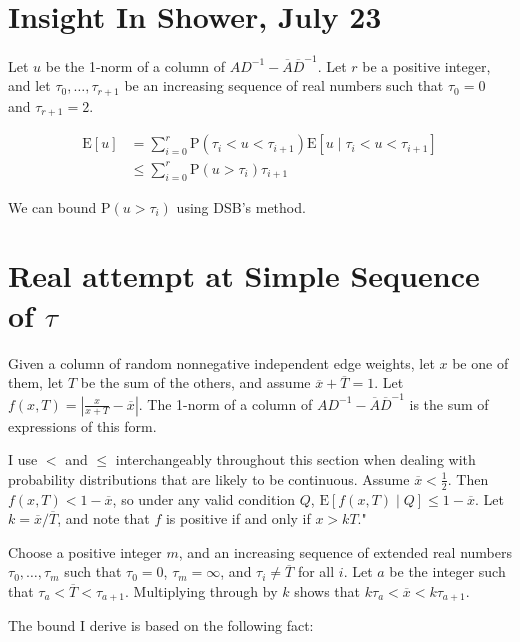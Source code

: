 \documentclass{article}
\newcommand \E[1] {\mathrm E \left[#1\right]} %
\newcommand \p[1] {\mathrm P \left(#1\right)}
\newcommand \inv [1] {{#1}^{-1}} %
\begin{document}

\section{Insight In Shower, July 23}

Let $u$ be the 1-norm of a column of $A\inv D - \overline A\inv{\overline D}$. Let $r$ be a positive integer, and let $\tau_0,\ldots,\tau_{r+1}$ be an increasing sequence of real numbers such that $\tau_0=0$ and $\tau_{r+1} = 2$.

\begin{align*}
\E u &= \sum_{i=0}^r \p{\tau_i<u<\tau_{i+1}}\E{u\mid \tau_i<u<\tau_{i+1}} \\
&\leq \sum_{i=0}^r \p{u>\tau_i}\tau_{i+1}
\end{align*}

We can bound $\p{u>\tau_i}$ using DSB's method.

\section{Real attempt at Simple Sequence of $\tau$}


Given a column of random nonnegative independent edge weights, let $x$ be one of them, let $T$ be the sum of the others, and assume $\overline x + \overline T = 1$. Let $f(x,T)=\left|\frac{x}{x+T}-\overline x\right|$. The 1-norm of a column of $A\inv D - \overline A\inv{\overline D}$ is the sum of expressions of this form.

I use $<$ and $\leq$ interchangeably throughout this section when dealing with probability distributions that are likely to be continuous. Assume $\overline x < \frac 1 2$. Then $f(x,T)<1-\overline x$, so under any valid condition $Q$, $\E{f(x,T)\mid Q} \leq 1-\overline x$. Let $k=\overline x / \overline T$, and note that $f$ is positive if and only if $x>kT$."

Choose a positive integer $m$, and an increasing sequence of extended real numbers $\tau_0,\ldots,\tau_m$ such that $\tau_0=0$, $\tau_m=\infty$, and $\tau_i\neq\overline T$ for all $i$. Let $a$ be the integer such that $\tau_a<\overline T<\tau_{a+1}$. Multiplying through by $k$ shows that $k\tau_a<\overline x<k\tau_{a+1}$.

The bound I derive is based on the following fact:
\end{document}

